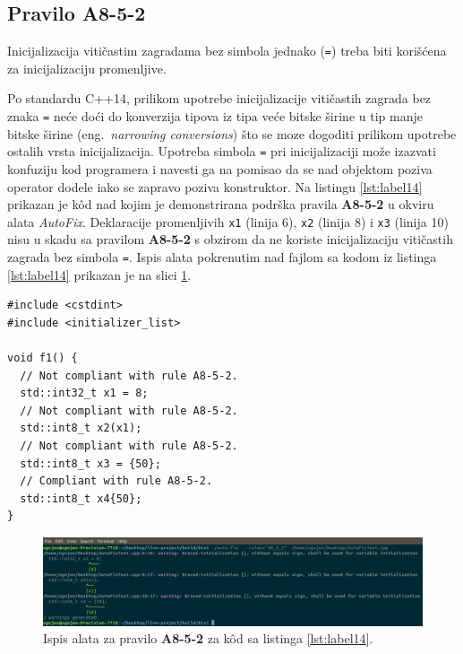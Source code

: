 \documentclass[12pt,oneside]{memoir}
\begin{document}
\subsection{Pravilo A8-5-2}
\begin{center}
\begin{tcolorbox}
Inicijalizacija viti\v{c}astim zagradama bez simbola jednako (\texttt{=}) treba biti kori\v{s}\'{c}ena za inicijalizaciju promenljive.
\end{tcolorbox}
\end{center}

Po standardu C++14, prilikom upotrebe inicijalizacije viti\v{c}astih zagrada bez znaka \texttt{=} ne\'{c}e do\'{c}i do konverzija tipova iz tipa ve\'{c}e bitske \v{s}irine u tip manje bitske \v{s}irine (eng.~\textit{narrowing conversions}) \v{s}to se moze dogoditi prilikom upotrebe ostalih vrsta inicijalizacija.
Upotreba simbola \texttt{=} pri inicijalizaciji mo\v{z}e izazvati konfuziju kod programera i navesti ga na pomisao da se nad objektom poziva operator dodele iako se zapravo poziva konstruktor.
Na listingu \ref{lst:label14} prikazan je k\^{o}d nad kojim je demonstrirana podr\v{s}ka pravila \textbf{A8-5-2} u okviru alata \textit{AutoFix}.
Deklaracije promenljivih \texttt{x1} (linija 6), \texttt{x2} (linija 8) i \texttt{x3} (linija 10) nisu u skadu sa pravilom \textbf{A8-5-2} s obzirom da ne koriste inicijalizaciju viti\v{c}astih zagrada bez simbola \texttt{=}.
Ispis alata pokrenutim nad fajlom sa kodom iz listinga \ref{lst:label14} prikazan je na slici \ref{fig:A8-5-2}. \\

\begin{lstlisting}[style=customc, caption={K\^{o}d nad kojim je demonstrirana podr\v{s}ka pravila \textbf{A8-5-2} u okviru alata \textit{AutoFix}.}, label=lst:label14]
#include <cstdint>
#include <initializer_list>

void f1() {
  // Not compliant with rule A8-5-2.
  std::int32_t x1 = 8;
  // Not compliant with rule A8-5-2.
  std::int8_t x2(x1);
  // Not compliant with rule A8-5-2.
  std::int8_t x3 = {50};
  // Compliant with rule A8-5-2.
  std::int8_t x4{50};
}
\end{lstlisting}

\begin{figure}[!h]
\begin{center}
\includegraphics[scale=0.3]{A8_5_2.png}
\end{center}
\caption{Ispis alata za pravilo \textbf{A8-5-2} za k\^{o}d sa listinga \ref{lst:label14}.}
\label{fig:A8-5-2}
\end{figure}
\end{document}
